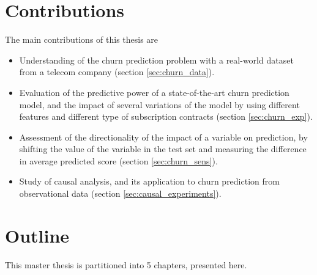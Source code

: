\section{Contributions}
The main contributions of this thesis are
\begin{itemize}
    \item Understanding of the churn prediction problem with a real-world
    dataset from a telecom company (section \ref{sec:churn_data}).
    \item Evaluation of the predictive power of a state-of-the-art churn
    prediction model, and the impact of several variations of the model by using
    different features and different type of subscription contracts (section
    \ref{sec:churn_exp}).
    \item Assessment of the directionality of the impact of a variable on
    prediction, by shifting the value of the variable in the test set and
    measuring the difference in average predicted score (section
    \ref{sec:churn_sens}).
    \item Study of causal analysis, and its application to churn prediction from
    observational data (section \ref{sec:causal_experiments}).
\end{itemize}

\section{Outline}

This master thesis is partitioned into 5 chapters, presented here.

